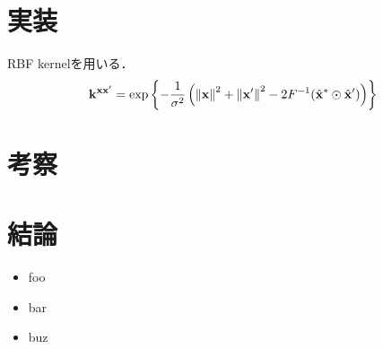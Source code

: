 \documentclass[11pt,a4j]{jarticle}
\newcommand\norm[1]{\left\lVert#1\right\rVert}
\begin{document}
  \section{実装}
    RBF kernelを用いる．
    \begin{align}
      {\bf {k}^{xx'}} = \exp \left\{ - \frac{1}{\sigma^2} \left( \norm{\bf x}^{2} + \norm{\bf x'}^{2} - 2 {F}^{-1} ( \hat{{\bf x}}^{*} \odot \hat{\bf x}' ) \right) \right\}
    \end{align}
  \section{考察}
  \section{結論}
    \begin{itemize}
      \item foo
      \item bar
      \item buz
    \end{itemize}

\end{document}
